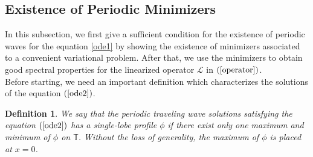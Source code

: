 \documentclass[12pt,reqno]{amsart}
\newcommand{\2}{L^2_{per}(0, T)}
\numberwithin{equation}{section}
\numberwithin{figure}{section}
\newtheorem{definition}[theorem]{Definition}
\begin{document}
\subsection{Existence of Periodic Minimizers} In this subsection, we first give a sufficient condition for the existence of periodic waves for the equation \eqref{ode1} by showing the existence of minimizers associated to a convenient variational problem. After that, we use the minimizers to obtain good spectral properties for the linearized operator $\mathcal{L}$ in $(\ref{operator})$. \\
\indent Before starting, we need an important definition which characterizes the solutions of the equation $(\ref{ode2})$.

\begin{definition}\label{defiSL}
	We say that the periodic traveling wave solutions satisfying the equation $(\ref{ode2})$ has a single-lobe profile $\phi$ if there exist only one maximum and minimum of $\phi$ on $\mathbb{T}$. Without the loss of generality, the maximum of $\phi$ is placed at $x=0$.
	
\end{definition}
\end{document}
